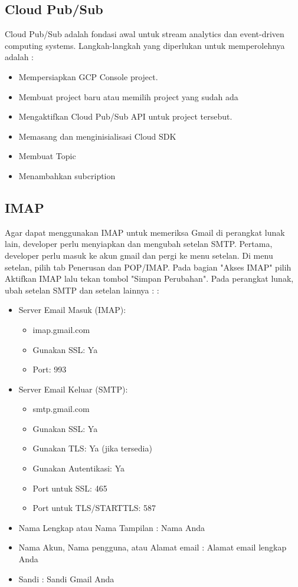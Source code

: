 \subsection{Cloud Pub/Sub}
Cloud Pub/Sub adalah fondasi awal untuk stream analytics dan event-driven computing systems. Langkah-langkah yang diperlukan untuk memperolehnya adalah\footnotemark
{} :
\begin{itemize}
\item Mempersiapkan GCP Console project.
\item Membuat project baru atau memilih project yang sudah ada
\item Mengaktifkan Cloud Pub/Sub API untuk project tersebut.
\item Memasang dan menginisialisasi Cloud SDK
\item Membuat Topic
\item Menambahkan subcription
\end{itemize}

\subsection{IMAP}
Agar dapat menggunakan IMAP untuk memeriksa Gmail di perangkat lunak lain, developer perlu menyiapkan dan mengubah setelan SMTP. Pertama, developer perlu masuk ke akun gmail dan pergi ke menu setelan. Di menu setelan, pilih tab Penerusan dan POP/IMAP. Pada bagian "Akses IMAP" pilih Aktifkan IMAP lalu tekan tombol "Simpan Perubahan". Pada perangkat lunak, ubah setelan SMTP dan setelan lainnya : \footnotemark
{} :
\begin{itemize}
\item Server Email Masuk (IMAP):
\begin{itemize}
\item imap.gmail.com
\item Gunakan SSL: Ya
\item Port: 993
\end{itemize}
\item Server Email Keluar (SMTP):
\begin{itemize}
\item smtp.gmail.com
\item Gunakan SSL: Ya
\item Gunakan TLS: Ya (jika tersedia)
\item Gunakan Autentikasi: Ya
\item Port untuk SSL: 465
\item Port untuk TLS/STARTTLS: 587
\end{itemize}
\item Nama Lengkap atau Nama Tampilan : Nama Anda
\item Nama Akun, Nama pengguna, atau Alamat email : Alamat email lengkap Anda
\item Sandi : Sandi Gmail Anda
\end{itemize}


